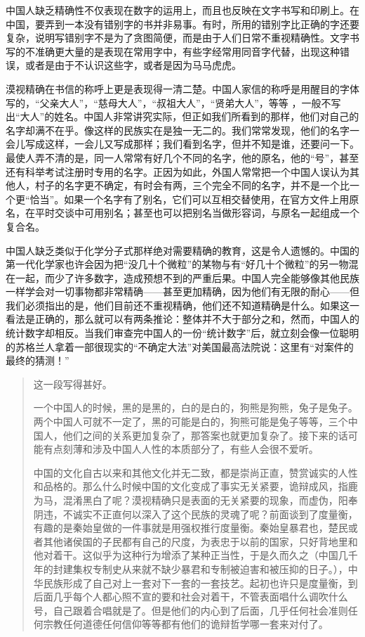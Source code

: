 \documentclass[12pt,oneside]{book}
\begin{document}
\begin{common-format}
中国人缺乏精确性不仅表现在数字的运用上，而且也反映在文字书写和印刷上。在中国，要弄到一本没有错别字的书并非易事。有时，所用的错别字比正确的字还要复杂，说明写错别字不是为了贪图简便，而是由于人们日常不重视精确性。文字书写的不准确更大量的是表现在常用字中，有些字经常用同音字代替，出现这种错误，或者是由于不认识这些字，或者是因为马马虎虎。 

漠视精确在书信的称呼上更是表现得一清二楚。中国人家信的称呼是用醒目的字体写的，“父亲大人”，“慈母大人”，“叔祖大人”，“贤弟大人”，等等 ，一般不写出“大人”的姓名。中国人非常讲究实际，但正如我们所看到的那样，他们对自己的名字却满不在乎。像这样的民族实在是独一无二的。我们常常发现，他们的名字一会儿写成这样，一会儿又写成那样；我们看到名字，但并不知是谁，还要问一下。最使人弄不清的是，同一人常常有好几个不同的名字，他的原名，他的“号”，甚至还有科举考试注册时专用的名字。正因为如此，外国人常常把一个中国人误认为其他人，村子的名字更不确定，有时会有两，三个完全不同的名字，并不是一个比一个更“恰当”。如果一个名字有了别名，它们可以互相交替使用，在官方文件上用原名，在平时交谈中可用别名；甚至也可以把别名当做形容词，与原名一起组成一个复合名。 

中国人缺乏类似于化学分子式那样绝对需要精确的教育，这是令人遗憾的。中国的第一代化学家也许会因为把“没几十个微粒”的某物与有“好几十个微粒”的另一物混在一起，而少了许多数字，造成预想不到的严重后果。中国人完全能够像其他民族一样学会对一切事物都非常精确——甚至更加精确，因为他们有无限的耐心——但我们必须指出的是，他们目前还不重视精确，他们还不知道精确是什么。如果这一看法是正确的，那么就可以有两条推论：整体并不大于部分之和，然而，中国人的统计数字却相反。当我们审查完中国人的一份“统计数字”后，就立刻会像一位聪明的苏格兰人拿着一部很现实的“不确定大法”对美国最高法院说：这里有“对案件的最终的猜测！”

\begin{quotation}
这一段写得甚好。

一个中国人的时候，黑的是黑的，白的是白的，狗熊是狗熊，兔子是兔子。两个中国人可就不一定了，黑的可能是白的，狗熊可能是兔子等等，三个中国人，他们之间的关系更加复杂了，那答案也就更加复杂了。接下来的话可能有点刻薄和涉及中国人人性的本质部分了，有些人会很不爱听。

中国的文化自古以来和其他文化并无二致，都是崇尚正直，赞赏诚实的人性和品格的。那么什么时候中国的文化变成了事实无关紧要，诡辩成风，指鹿为马，混淆黑白了呢？漠视精确只是表面的无关紧要的现象，而虚伪，阳奉阴违，不诚实不正直何以深入了这个民族的灵魂了呢？前面谈到了度量衡，有趣的是秦始皇做的一件事就是用强权推行度量衡。秦始皇暴君也，楚民或者其他诸侯国的子民都有自己的尺度，为表忠于以前的国家，只好背地里和他对着干。这似乎为这种行为增添了某种正当性，于是久而久之（中国几千年的封建集权专制史从来就不缺少暴君和专制被迫害和被压抑的日子。），中华民族形成了自己对上一套对下一套的一套技艺。起初也许只是度量衡，到后面几乎每个人都心照不宣的要和社会对着干，不管表面唱什么调吹什么号，自己跟着合唱就是了。但是他们的内心到了后面，几乎任何社会准则任何宗教任何道德任何信仰等等都有他们的诡辩哲学哪一套来对付了。


\end{quotation}
\end{common-format}
\end{document}
